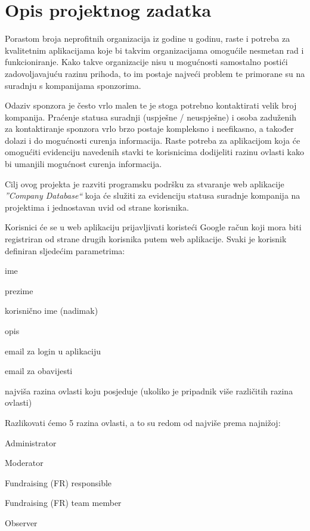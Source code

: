 \chapter{Opis projektnog zadatka}
		
		
		{Porastom broja neprofitnih organizacija iz godine u godinu, raste i potreba za kvalitetnim aplikacijama koje bi takvim organizacijama omogućile nesmetan rad i funkcioniranje. Kako takve organizacije nisu u mogućnosti samostalno postići zadovoljavajuću razinu prihoda, to im postaje najveći problem te primorane su na suradnju s kompanijama sponzorima.}

		{Odaziv sponzora je često vrlo malen te je stoga potrebno kontaktirati velik broj kompanija. Praćenje statusa suradnji (uspješne / neuspješne) i osoba zaduženih za kontaktiranje sponzora vrlo brzo postaje kompleksno i neefikasno, a također dolazi i do mogućnosti curenja informacija. Raste potreba za aplikacijom koja će omogućiti evidenciju navedenih stavki te korisnicima dodijeliti razinu ovlasti kako bi umanjili mogućnost curenja informacija.}

		{Cilj ovog projekta je razviti programsku podršku za stvaranje web aplikacije \textit{”Company Database“} koja će služiti za evidenciju statusa suradnje kompanija na projektima i jednostavan uvid od strane  korisnika.}\vspace{0.2cm}
		

		{Korisnici će se u web aplikaciju prijavljivati koristeći Google račun koji mora biti registriran od strane drugih korisnika putem web aplikacije. Svaki je korisnik definiran sljedećim parametrima:}
		\begin{packed_item}
			\item {ime}
			\item {prezime}
			\item {korisnično ime} (nadimak)
			\item {opis}
			\item {email za login u aplikaciju}
			\item {email za obavijesti}
			\item {najviša razina ovlasti koju posjeduje (ukoliko je pripadnik više različitih razina ovlasti)}
		\end{packed_item}
		
		{Razlikovati ćemo 5 razina ovlasti, a to su redom od najviše prema najnižoj:}
		\begin{packed_item}
			\item {Administrator}
			\item {Moderator}
			\item {Fundraising (FR) responsible}
			\item {Fundraising (FR) team member}
			\item {Observer}
		\end{packed_item}

